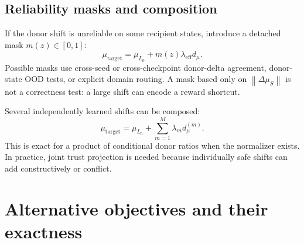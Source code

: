 \documentclass[11pt,a4paper]{article}
\newcommand{\norm}[1]{\left\lVert #1 \right\rVert}
\newcommand{\Lbase}{L_0}
\newcommand{\dmuS}{\Delta\mu_S}
\theoremstyle{plain}
\theoremstyle{definition}
\begin{document}
\subsection{Reliability masks and composition}

If the donor shift is unreliable on some recipient states, introduce a detached mask
$m(z)\in[0,1]$:
\begin{equation}
\mu_{\mathrm{target}}
=
\mu_{\Lbase}
+m(z)\lambda_{\mathrm{eff}}d_\mu.
\label{eq:masked-target}
\end{equation}
Possible masks use cross-seed or cross-checkpoint donor-delta agreement, donor-state OOD tests, or
explicit domain routing.  A mask based only on $\norm{\dmuS}$ is not a correctness test: a large
shift can encode a reward shortcut.

Several independently learned shifts can be composed:
\begin{equation}
\mu_{\mathrm{target}}
=
\mu_{\Lbase}
+\sum_{m=1}^M
\lambda_m d_\mu^{(m)}.
\label{eq:composed-shifts}
\end{equation}
This is exact for a product of conditional donor ratios when the normalizer exists.  In practice,
joint trust projection is needed because individually safe shifts can add constructively or
conflict.

\section{Alternative objectives and their exactness}
\label{sec:alternatives}
\end{document}

